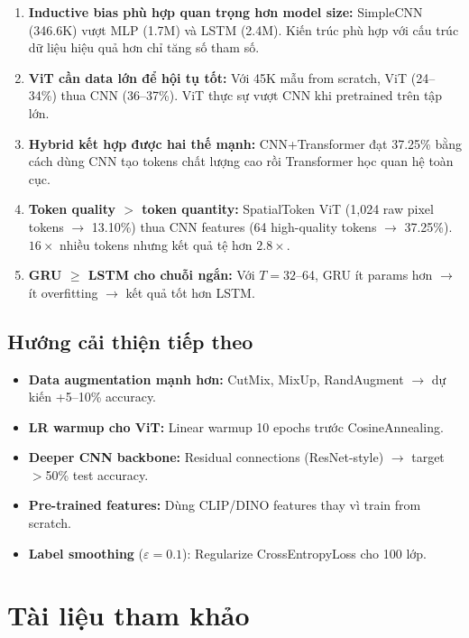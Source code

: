 \documentclass[12pt, a4paper]{article}
\begin{document}
\begin{enumerate}
  \item \textbf{Inductive bias phù hợp quan trọng hơn model size:} SimpleCNN (346.6K) vượt MLP (1.7M) và LSTM (2.4M). Kiến trúc phù hợp với cấu trúc dữ liệu hiệu quả hơn chỉ tăng số tham số.

  \item \textbf{ViT cần data lớn để hội tụ tốt:} Với 45K mẫu from scratch, ViT (24--34\%) thua CNN (36--37\%). ViT thực sự vượt CNN khi pretrained trên tập lớn.

  \item \textbf{Hybrid kết hợp được hai thế mạnh:} CNN+Transformer đạt 37.25\% bằng cách dùng CNN tạo tokens chất lượng cao rồi Transformer học quan hệ toàn cục.

  \item \textbf{Token quality $>$ token quantity:} SpatialToken ViT (1,024 raw pixel tokens $\rightarrow$ 13.10\%) thua CNN features (64 high-quality tokens $\rightarrow$ 37.25\%). $16\times$ nhiều tokens nhưng kết quả tệ hơn $2.8\times$.

  \item \textbf{GRU $\geq$ LSTM cho chuỗi ngắn:} Với $T=32$--64, GRU ít params hơn $\rightarrow$ ít overfitting $\rightarrow$ kết quả tốt hơn LSTM.
\end{enumerate}

\subsection{Hướng cải thiện tiếp theo}

\begin{itemize}
  \item \textbf{Data augmentation mạnh hơn:} CutMix, MixUp, RandAugment $\rightarrow$ dự kiến +5--10\% accuracy.
  \item \textbf{LR warmup cho ViT:} Linear warmup 10 epochs trước CosineAnnealing.
  \item \textbf{Deeper CNN backbone:} Residual connections (ResNet-style) $\rightarrow$ target $>$50\% test accuracy.
  \item \textbf{Pre-trained features:} Dùng CLIP/DINO features thay vì train from scratch.
  \item \textbf{Label smoothing} ($\varepsilon=0.1$): Regularize CrossEntropyLoss cho 100 lớp.
\end{itemize}

\section{Tài liệu tham khảo}
\end{document}
